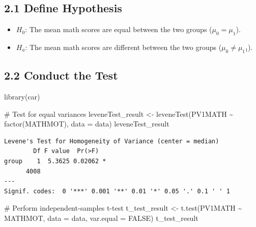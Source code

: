 \documentclass[
  letterpaper,
  DIV=11,
  numbers=noendperiod]{scrreprt}
\newenvironment{Shaded}{\begin{snugshade}}{\end{snugshade}}
\newcommand{\AttributeTok}[1]{\textcolor[rgb]{0.40,0.45,0.13}{#1}}
\newcommand{\CommentTok}[1]{\textcolor[rgb]{0.37,0.37,0.37}{#1}}
\newcommand{\ConstantTok}[1]{\textcolor[rgb]{0.56,0.35,0.01}{#1}}
\newcommand{\FunctionTok}[1]{\textcolor[rgb]{0.28,0.35,0.67}{#1}}
\newcommand{\NormalTok}[1]{\textcolor[rgb]{0.00,0.23,0.31}{#1}}
\newcommand{\OtherTok}[1]{\textcolor[rgb]{0.00,0.23,0.31}{#1}}
\newcommand{\SpecialCharTok}[1]{\textcolor[rgb]{0.37,0.37,0.37}{#1}}
\begin{document}
\subsection*{2.1 Define Hypothesis}\label{define-hypothesis-2}

\begin{itemize}
\item
  \(H_0\): The mean math scores are equal between the two groups
  (\(\mu_0=\mu_1\)).
\item
  \(H_a\): The mean math scores are different between the two groups
  (\(\mu_0\ne \mu_1\)₁).
\end{itemize}

\subsection*{2.2 Conduct the Test}\label{conduct-the-test-2}

\begin{Shaded}
\begin{Highlighting}[]
\FunctionTok{library}\NormalTok{(car) }
 
\CommentTok{\# Test for equal variances }
\NormalTok{leveneTest\_result }\OtherTok{\textless{}{-}} \FunctionTok{leveneTest}\NormalTok{(PV1MATH }\SpecialCharTok{\textasciitilde{}} \FunctionTok{factor}\NormalTok{(MATHMOT), }\AttributeTok{data =}\NormalTok{ data) }
\NormalTok{leveneTest\_result }
\end{Highlighting}
\end{Shaded}

\begin{verbatim}
Levene's Test for Homogeneity of Variance (center = median)
        Df F value  Pr(>F)  
group    1  5.3625 0.02062 *
      4008                  
---
Signif. codes:  0 '***' 0.001 '**' 0.01 '*' 0.05 '.' 0.1 ' ' 1
\end{verbatim}

\begin{Shaded}
\begin{Highlighting}[]
\CommentTok{\# Perform independent{-}samples t{-}test }
\NormalTok{t\_test\_result }\OtherTok{\textless{}{-}} \FunctionTok{t.test}\NormalTok{(PV1MATH }\SpecialCharTok{\textasciitilde{}}\NormalTok{ MATHMOT, }\AttributeTok{data =}\NormalTok{ data, }\AttributeTok{var.equal =} \ConstantTok{FALSE}\NormalTok{) }
\NormalTok{t\_test\_result }
\end{Highlighting}
\end{Shaded}
\end{document}
